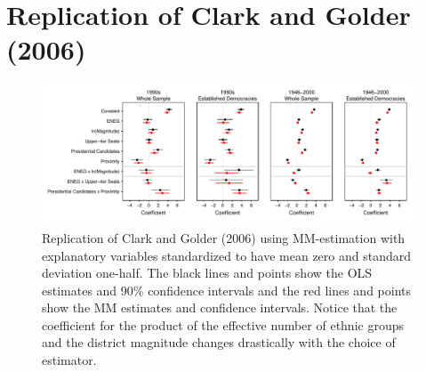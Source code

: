\documentclass[12pt]{article}
\begin{document}
\singlespace

%



\section*{Replication of Clark and Golder (2006)}

\begin{figure}[H]
\begin{center}
\includegraphics[scale = .8]{figs/cg-coef-plots.pdf}
\caption{Replication of Clark and Golder (2006) using MM-estimation with explanatory variables standardized to have mean zero and standard deviation one-half. The black lines and points show the OLS estimates and 90\% confidence intervals and the red lines and points show the MM estimates and confidence intervals. Notice that the coefficient for the product of the effective number of ethnic groups and the district magnitude changes drastically with the choice of estimator.}\label{fig:cg-coef-plots}
\end{center}
\end{figure}
\end{document}
